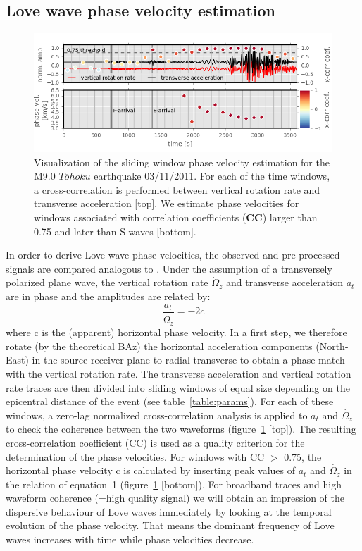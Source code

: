 \documentclass[12pt,reqno,letter]{article} %
\begin{document}
\subsection{Love wave phase velocity estimation}
\label{subsec:pv}
\begin{figure}[!htp]
\centering
\includegraphics[width=\textwidth]{paper_plot1.png}
\caption{Visualization of the sliding window phase velocity estimation for the M9.0 $T\overline{o}hoku$ earthquake 03/11/2011. For each of the time windows, a cross-correlation is performed between vertical rotation rate and transverse acceleration [top]. We estimate phase velocities for windows associated with correlation coefficients (\textbf{CC}) larger than 0.75 and later than S-waves [bottom].}
\label{fig:phase_vel}
\end{figure}
\noindent
In order to derive Love wave phase velocities, the observed and pre-processed signals are compared analogous to \cite{Igel2005}. Under the assumption of a transversely polarized plane wave, the vertical rotation rate $\dot{\Omega}_z$ and transverse acceleration $a_t$ are in phase and the amplitudes are related by: 
\begin{equation}
	\frac{a_t}{\dot{\Omega}_z} = -2c
\end{equation}
where c is the (apparent) horizontal phase velocity. In a first step, we therefore rotate (by the theoretical BAz) the horizontal acceleration components (North-East) in the source-receiver plane to radial-transverse to obtain a phase-match with the vertical rotation rate. The transverse acceleration and vertical rotation rate traces are then divided into sliding windows of equal size depending on the epicentral distance of the event (see table~\ref{table:params}).
For each of these windows, a zero-lag normalized cross-correlation analysis is applied to $a_t$ and $\dot{\Omega_z}$ to check the coherence between the two waveforms (figure~\ref{fig:phase_vel} [top]). The resulting cross-correlation coefficient (CC) is used as a quality criterion for the determination of the phase velocities. For windows with CC $>$ 0.75, the horizontal phase velocity c is calculated by inserting peak values of $a_t$ and $\dot{\Omega_z}$ in the relation of equation~1 (figure~\ref{fig:phase_vel} [bottom]).
For broadband traces and high waveform coherence (=high quality signal) we will obtain an impression of the dispersive behaviour of Love waves immediately by looking at the temporal evolution of the phase velocity. That means the dominant frequency of Love waves increases with time while phase velocities decrease.
\end{document}
